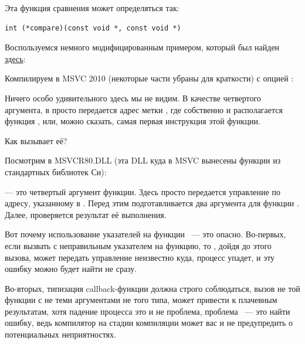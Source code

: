 Эта функция сравнения может определяться так:

\begin{lstlisting}
int (*compare)(const void *, const void *)
\end{lstlisting}

Воспользуемся немного модифицированным примером, который был найден \href{http://go.yurichev.com/17079}{здесь}:




Компилируем в MSVC 2010 (некоторые части убраны для краткости) с опцией \TT{\Ox}:



Ничего особо удивительного здесь мы не видим. В качестве четвертого аргумента, 
в \qsort просто передается адрес метки , где собственно и располагается функция \comp,
или, можно сказать, самая первая инструкция этой функции.

Как \qsort вызывает её?

Посмотрим в MSVCR80.DLL (эта DLL куда в MSVC вынесены функции из стандартных библиотек Си):



 --- это четвертый аргумент функции. 
Здесь просто передается управление по адресу, указанному в . 
Перед этим подготавливается два аргумента для функции \comp. 
Далее, проверяется результат её выполнения.

Вот почему использование указателей на функции ~--- это опасно. 
Во-первых, если вызвать \qsort с неправильным указателем на функцию, 
то \qsort, дойдя до этого вызова, может передать управление неизвестно куда, 
процесс упадет, и эту ошибку можно будет найти не сразу.

Во-вторых, типизация callback-функции должна строго соблюдаться, 
вызов не той функции с не теми аргументами не того типа, 
может привести к плачевным результатам, 
хотя падение процесса это и не проблема, проблема ~--- это найти ошибку, ведь компилятор 
на стадии компиляции может вас и не предупредить о потенциальных неприятностях.




